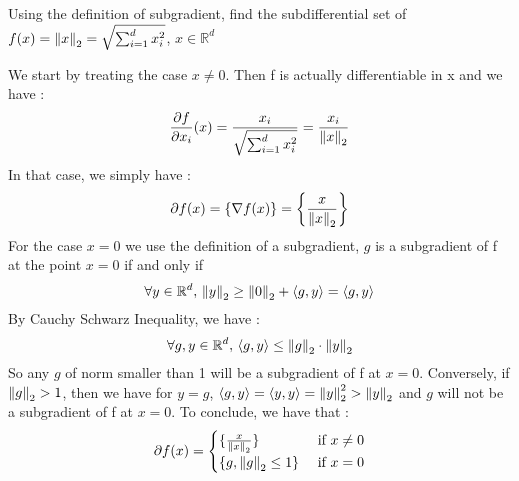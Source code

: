 \begin{exercise}[]{}
	Using the definition of subgradient, find the subdifferential set of $ f(x) = \left\|x\right\|_2 = \sqrt{\sum_{i=1}^{d}x_i^2}$, $ x\in \mathbb{R}^d $
\end{exercise}

\begin{solution}[]
	We start by treating the case $ x \neq 0 $. Then f is actually differentiable in x and we have :
\begin{equation*}
	\frac{\partial f}{\partial x_i}(x) = \frac{x_i}{\sqrt{\sum_{i=1}^{d}x_i^2}} = \frac{x_i}{\left\|x\right\|_2}
\end{equation*}
In that case, we simply have :
\begin{equation*}
	\partial f(x) = \{ \nabla f(x) \} = \left\{ \frac{x}{\left\|x\right\|_2} \right\}
\end{equation*}
For the case $ x=0 $ we use the definition of a subgradient, $ g $ is a subgradient of f at the point $ x=0 $ if and only if
\begin{equation*}
	\forall y \in \mathbb{R}^d,\, \left\|y\right\|_2 \geq \left\|0\right\|_2 + \langle g,y\rangle = \langle g,y\rangle
\end{equation*}
By Cauchy Schwarz Inequality, we have :
\begin{equation*}
	\forall g,y \in \mathbb{R}^d,\, \langle g,y\rangle \leq \left\|g\right\|_2\cdot \left\|y\right\|_2
\end{equation*}
So any $ g $ of norm smaller than 1 will be a subgradient of f at $ x=0 $. Conversely, if $ \left\|g\right\|_2 > 1 $, then we have for $ y=g $, $ \langle g,y\rangle = \langle y,y\rangle = \left\|y\right\|_2^2 > \left\|y\right\|_2 $ and $ g $ will not be a subgradient of f at $ x=0 $.
To conclude, we have that :
\begin{align*}
\partial f(x) =
\begin{cases}
	\{ \frac{x}{\left\|x\right\|_2} \} &\text{ if } x \neq 0 \\
	\{ g, \left\|g\right\|_2 \leq 1 \} &\text{ if } x = 0
\end{cases}
\end{align*}





\end{solution}
